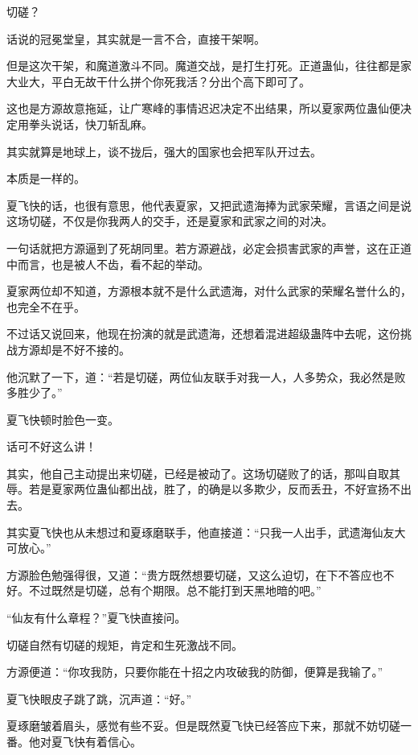 
\begin{this_body}



切磋？

话说的冠冕堂皇，其实就是一言不合，直接干架啊。

但是这次干架，和魔道激斗不同。魔道交战，是打生打死。正道蛊仙，往往都是家大业大，平白无故干什么拼个你死我活？分出个高下即可了。

这也是方源故意拖延，让广寒峰的事情迟迟决定不出结果，所以夏家两位蛊仙便决定用拳头说话，快刀斩乱麻。

其实就算是地球上，谈不拢后，强大的国家也会把军队开过去。

本质是一样的。

夏飞快的话，也很有意思，他代表夏家，又把武遗海捧为武家荣耀，言语之间是说这场切磋，不仅是你我两人的交手，还是夏家和武家之间的对决。

一句话就把方源逼到了死胡同里。若方源避战，必定会损害武家的声誉，这在正道中而言，也是被人不齿，看不起的举动。

夏家两位却不知道，方源根本就不是什么武遗海，对什么武家的荣耀名誉什么的，也完全不在乎。

不过话又说回来，他现在扮演的就是武遗海，还想着混进超级蛊阵中去呢，这份挑战方源却是不好不接的。

他沉默了一下，道：“若是切磋，两位仙友联手对我一人，人多势众，我必然是败多胜少了。”

夏飞快顿时脸色一变。

话可不好这么讲！

其实，他自己主动提出来切磋，已经是被动了。这场切磋败了的话，那叫自取其辱。若是夏家两位蛊仙都出战，胜了，的确是以多欺少，反而丢丑，不好宣扬不出去。

其实夏飞快也从未想过和夏琢磨联手，他直接道：“只我一人出手，武遗海仙友大可放心。”

方源脸色勉强得很，又道：“贵方既然想要切磋，又这么迫切，在下不答应也不好。不过既然是切磋，总有个期限。总不能打到天黑地暗的吧。”

“仙友有什么章程？”夏飞快直接问。

切磋自然有切磋的规矩，肯定和生死激战不同。

方源便道：“你攻我防，只要你能在十招之内攻破我的防御，便算是我输了。”

夏飞快眼皮子跳了跳，沉声道：“好。”

夏琢磨皱着眉头，感觉有些不妥。但是既然夏飞快已经答应下来，那就不妨切磋一番。他对夏飞快有着信心。


\end{this_body}
